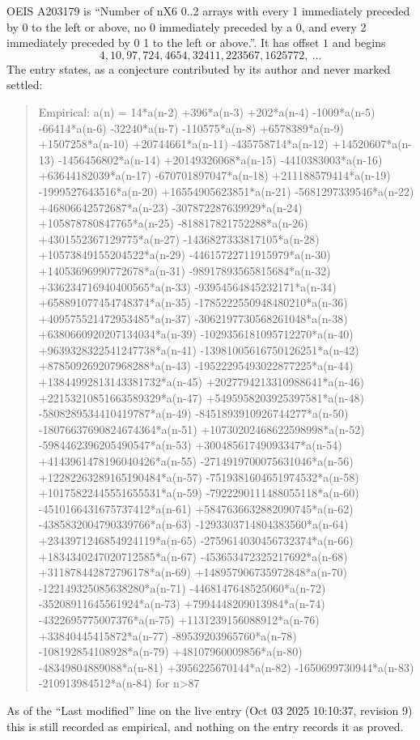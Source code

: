 \documentclass[11pt,a4paper]{article}
\theoremstyle{plain}
\theoremstyle{definition}
\begin{document}
OEIS A203179 is ``Number of nX6 0..2 arrays with every 1 immediately preceded by 0 to the left or above, no 0 immediately preceded by a 0, and every 2 immediately preceded by 0 1 to the left or above.''. It has offset $1$ and begins
\[
4, 10, 97, 724, 4654, 32411, 223567, 1625772,\ \dots
\]
The entry states, as a conjecture contributed by its author and never marked settled:
\begin{quote}
Empirical: a(n) = 14*a(n-2) +396*a(n-3) +202*a(n-4) -1009*a(n-5) -66414*a(n-6) -32240*a(n-7) -110575*a(n-8) +6578389*a(n-9) +1507258*a(n-10) +20744661*a(n-11) -435758714*a(n-12) +14520607*a(n-13) -1456456802*a(n-14) +20149326068*a(n-15) -4410383003*a(n-16) +63644182039*a(n-17) -670701897047*a(n-18) +211188579414*a(n-19) -1999527643516*a(n-20) +16554905623851*a(n-21) -5681297339546*a(n-22) +46806642572687*a(n-23) -307872287639929*a(n-24) +105878780847765*a(n-25) -818817821752288*a(n-26) +4301552367129775*a(n-27) -1436827333817105*a(n-28) +10573849155204522*a(n-29) -44615722711915979*a(n-30) +14053696990772678*a(n-31) -98917893565815684*a(n-32) +336234716940400565*a(n-33) -93954564845232171*a(n-34) +658891077454748374*a(n-35) -1785222550948480210*a(n-36) +409575521472953485*a(n-37) -3062197730568261048*a(n-38) +6380660920207134034*a(n-39) -1029356181095712270*a(n-40) +9639328322541247738*a(n-41) -13981005616750126251*a(n-42) +878509269207968288*a(n-43) -19522295493022877225*a(n-44) +13844992813143381732*a(n-45) +2027794213310988641*a(n-46) +22153210851663589329*a(n-47) +5495958203925397581*a(n-48) -5808289534410419787*a(n-49) -8451893910926744277*a(n-50) -18076637690824674364*a(n-51) +10730202468622598998*a(n-52) -5984462396205490547*a(n-53) +30048561749093347*a(n-54) +4143961478196040426*a(n-55) -2714919700075631046*a(n-56) +12282263289165190484*a(n-57) -7519381604651974532*a(n-58) +10175822445551655531*a(n-59) -7922290111488055118*a(n-60) -4510166431675737412*a(n-61) +5847636632882090745*a(n-62) -4385832004790339766*a(n-63) -1293303714804383560*a(n-64) +2343971246854924119*a(n-65) -2759614030456732374*a(n-66) +1834340247020712585*a(n-67) -453653472325217692*a(n-68) +311878442872796178*a(n-69) +148957906735972848*a(n-70) -122149325085638280*a(n-71) -4468147648525060*a(n-72) -35208911645561924*a(n-73) +7994448209013984*a(n-74) -4322695775007376*a(n-75) +1131239156088912*a(n-76) +33840445415872*a(n-77) -89539203965760*a(n-78) -108192854108928*a(n-79) +48107960009856*a(n-80) -48349804889088*a(n-81) +3956225670144*a(n-82) -1650699730944*a(n-83) -210913984512*a(n-84) for n>87
\end{quote}
As of the ``Last modified'' line on the live entry (Oct 03 2025 10:10:37, revision 9) this is still
recorded as empirical, and nothing on the entry records it as proved.
\end{document}
